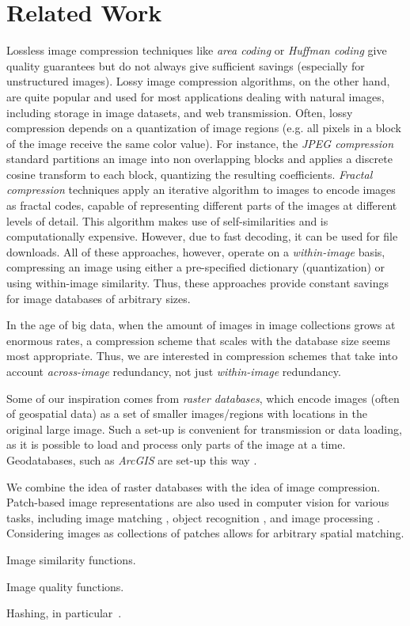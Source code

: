 \section{Related Work}\label{sec:related}

Lossless image compression techniques like \emph{area coding} or \emph{Huffman coding} give quality guarantees but do not always give sufficient savings (especially for unstructured images). Lossy image compression algorithms, on the other hand, are quite popular and used for most applications dealing with natural images, including storage in image datasets, and web transmission. Often, lossy compression depends on a quantization of image regions (e.g. all pixels in a block of the image receive the same color value). For instance, the \emph{JPEG compression} standard partitions an image into non overlapping blocks and applies a discrete cosine transform to each block, quantizing the resulting coefficients. \emph{Fractal compression} techniques \cite{Jacquin} apply an iterative algorithm to images to encode images as fractal codes, capable of representing different parts of the images at different levels of detail. This algorithm makes use of self-similarities and is computationally expensive. However, due to fast decoding, it can be used for file downloads. All of these approaches, however, operate on a \emph{within-image} basis, compressing an image using either a pre-specified dictionary (quantization) or using within-image similarity. Thus, these approaches provide constant savings for image databases of arbitrary sizes.

In the age of big data, when the amount of images in image collections grows at enormous rates, a compression scheme that scales with the database size seems most appropriate. Thus, we are interested in compression schemes that take into account \emph{across-image} redundancy, not just \emph{within-image} redundancy. 

Some of our inspiration comes from \emph{raster databases}, which encode images (often of geospatial data) as a set of smaller images/regions with locations in the original large image. Such a set-up is convenient for transmission or data loading, as it is possible to load and process only parts of the image at a time. Geodatabases, such as \emph{ArcGIS} are set-up this way \cite{ArcGIS}.

We combine the idea of raster databases with the idea of image compression. Patch-based image representations are also used in computer vision for various tasks, including image matching \cite{Brown05}, object recognition \cite{vashist2006dps}, and image processing \cite{Barnes2009}. Considering images as collections of patches allows for arbitrary spatial matching. 

\begin{edit}

Image similarity functions.

Image quality functions.

Hashing, in particular~\cite{LSH:Andoni}.

\end{edit}